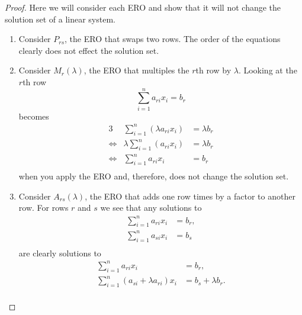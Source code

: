 \begin{proof}
    Here we will consider each ERO and show that it will not change the solution set of a linear system.
    \begin{enumerate}
        \item Consider $P_{rs}$, the ERO that swaps two rows. The order of the equations clearly does not effect the solution set.
        
        \item Consider $M_r(\lambda)$, the ERO that multiples the $r$th row by $\lambda$. Looking at the $r$th row \[\sum_{i=1}^n{a_{ri}x_i}=b_r\] becomes
        \begin{alignat*}{3}
            &{}\sum_{i=1}^n{\left(\lambda a_{ri}x_i\right)}&{}=\lambda b_r\\
            \iff{}&\lambda\sum_{i=1}^n{\left(a_{ri}x_i\right)}&{}=\lambda b_r\\
            \iff{}&\sum_{i=1}^n{a_{ri}x_i}&=b_r\\
        \end{alignat*}
        when you apply the ERO and, therefore, does not change the solution set.
        
        \item Consider $A_{rs}(\lambda)$, the ERO that adds one row times by a factor to another row. For rows $r$ and $s$ we see that any solutions to
        \begin{align*}
            \sum_{i=1}^n{a_{ri}x_i}&=b_r,\\
            \sum_{i=1}^n{a_{si}x_i}&=b_s\\
        \end{align*}
        are clearly solutions to
        \begin{align*}
            \sum_{i=1}^n{a_{ri}x_i}&=b_r,\\
            \sum_{i=1}^n{(a_{si}+\lambda a_{ri})x_i}&=b_s+\lambda b_r.\\
        \end{align*}
    \end{enumerate}
\end{proof}


